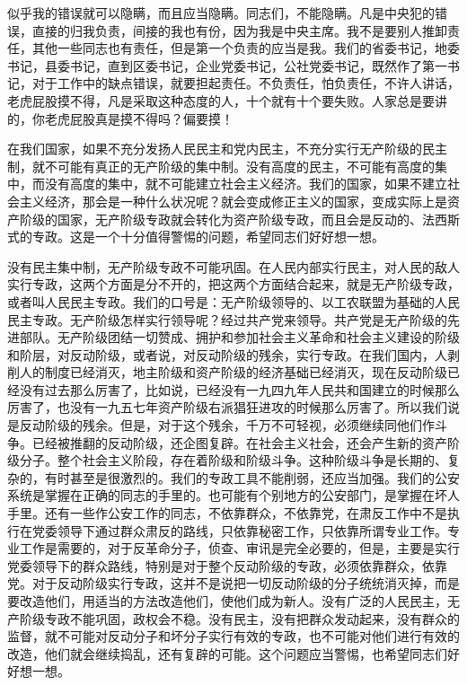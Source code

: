 似乎我的错误就可以隐瞒，而且应当隐瞒。同志们，不能隐瞒。凡是中央犯的错误，直接的归我负责，间接的我也有份，因为我是中央主席。我不是要别人推卸责任，其他一些同志也有责任，但是第一个负责的应当是我。我们的省委书记，地委书记，县委书记，直到区委书记，企业党委书记，公社党委书记，既然作了第一书记，对于工作中的缺点错误，就要担起责任。不负责任，怕负责任，不许人讲话，老虎屁股摸不得，凡是采取这种态度的人，十个就有十个要失败。人家总是要讲的，你老虎屁股真是摸不得吗？偏要摸！

在我们国家，如果不充分发扬人民民主和党内民主，不充分实行无产阶级的民主制，就不可能有真正的无产阶级的集中制。没有高度的民主，不可能有高度的集中，而没有高度的集中，就不可能建立社会主义经济。我们的国家，如果不建立社会主义经济，那会是一种什么状况呢？就会变成修正主义的国家，变成实际上是资产阶级的国家，无产阶级专政就会转化为资产阶级专政，而且会是反动的、法西斯式的专政。这是一个十分值得警惕的问题，希望同志们好好想一想。

没有民主集中制，无产阶级专政不可能巩固。在人民内部实行民主，对人民的敌人实行专政，这两个方面是分不开的，把这两个方面结合起来，就是无产阶级专政，或者叫人民民主专政。我们的口号是：无产阶级领导的、以工农联盟为基础的人民民主专政。无产阶级怎样实行领导呢？经过共产党来领导。共产党是无产阶级的先进部队。无产阶级团结一切赞成、拥护和参加社会主义革命和社会主义建设的阶级和阶层，对反动阶级，或者说，对反动阶级的残余，实行专政。在我们国内，人剥削人的制度已经消灭，地主阶级和资产阶级的经济基础已经消灭，现在反动阶级已经没有过去那么厉害了，比如说，已经没有一九四九年人民共和国建立的时候那么厉害了，也没有一九五七年资产阶级右派猖狂进攻的时候那么厉害了。所以我们说是反动阶级的残余。但是，对于这个残余，千万不可轻视，必须继续同他们作斗争。已经被推翻的反动阶级，还企图复辟。在社会主义社会，还会产生新的资产阶级分子。整个社会主义阶段，存在着阶级和阶级斗争。这种阶级斗争是长期的、复杂的，有时甚至是很激烈的。我们的专政工具不能削弱，还应当加强。我们的公安系统是掌握在正确的同志的手里的。也可能有个别地方的公安部门，是掌握在坏人手里。还有一些作公安工作的同志，不依靠群众，不依靠党，在肃反工作中不是执行在党委领导下通过群众肃反的路线，只依靠秘密工作，只依靠所谓专业工作。专业工作是需要的，对于反革命分子，侦查、审讯是完全必要的，但是，主要是实行党委领导下的群众路线，特别是对于整个反动阶级的专政，必须依靠群众，依靠党。对于反动阶级实行专政，这并不是说把一切反动阶级的分子统统消灭掉，而是要改造他们，用适当的方法改造他们，使他们成为新人。没有广泛的人民民主，无产阶级专政不能巩固，政权会不稳。没有民主，没有把群众发动起来，没有群众的监督，就不可能对反动分子和坏分子实行有效的专政，也不可能对他们进行有效的改造，他们就会继续捣乱，还有复辟的可能。这个问题应当警惕，也希望同志们好好想一想。

